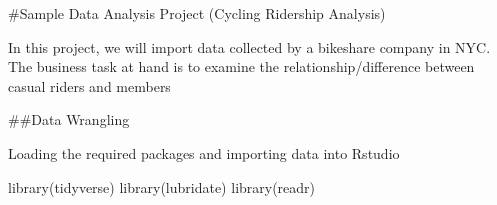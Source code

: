 \documentclass[
]{article}
\author{}
\date{\vspace{-2.5em}}
\newenvironment{Shaded}{\begin{snugshade}}{\end{snugshade}}
\newcommand{\FunctionTok}[1]{\textcolor[rgb]{0.00,0.00,0.00}{#1}}
\newcommand{\NormalTok}[1]{#1}
\begin{document}
\#Sample Data Analysis Project (Cycling Ridership Analysis)

In this project, we will import data collected by a bikeshare company in
NYC. The business task at hand is to examine the relationship/difference
between casual riders and members

\#\#Data Wrangling

Loading the required packages and importing data into Rstudio

\begin{Shaded}
\begin{Highlighting}[]
\FunctionTok{library}\NormalTok{(tidyverse)}
\FunctionTok{library}\NormalTok{(lubridate)}
\FunctionTok{library}\NormalTok{(readr)}
\end{Highlighting}
\end{Shaded}
\end{document}
